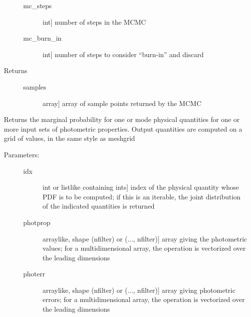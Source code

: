 \documentclass[letterpaper,10pt,english]{sphinxmanual}
\begin{document}
\begin{fulllineitems}
\begin{fulllineitems}
\begin{description}
\begin{description}
\item[{mc\_steps}] \leavevmode{[}int{]}
number of steps in the MCMC

\item[{mc\_burn\_in}] \leavevmode{[}int{]}
number of steps to consider ``burn-in'' and discard

\end{description}

\item[{Returns}] \leavevmode\begin{description}
\item[{samples}] \leavevmode{[}array{]}
array of sample points returned by the MCMC

\end{description}

\end{description}

\end{fulllineitems}


\begin{fulllineitems}
\label{bayesphot:slugpy.bayesphot.bp.bp.mpdf}
Returns the marginal probability for one or mode physical
quantities for one or more input sets of photometric
properties. Output quantities are computed on a grid of
values, in the same style as meshgrid
\begin{description}
\item[{Parameters:}] \leavevmode\begin{description}
\item[{idx}] \leavevmode{[}int or listlike containing ints{]}
index of the physical quantity whose PDF is to be
computed; if this is an iterable, the joint distribution of
the indicated quantities is returned

\item[{photprop}] \leavevmode{[}arraylike, shape (nfilter) or (..., nfilter){]}
array giving the photometric values; for a
multidimensional array, the operation is vectorized over
the leading dimensions

\item[{photerr}] \leavevmode{[}arraylike, shape (nfilter) or (..., nfilter){]}
array giving photometric errors; for a multidimensional
array, the operation is vectorized over the leading
dimensions


\end{description}
\end{description}
\end{fulllineitems}
\end{fulllineitems}
\end{document}
